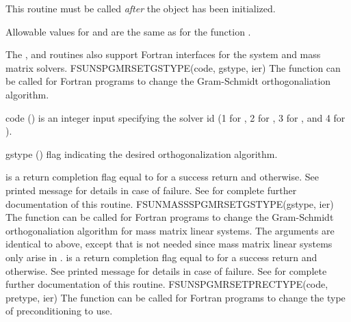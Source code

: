 {
  This routine must be called \emph{after} the {\nvector} object has
  been initialized.

  Allowable values for  and  are the same as for
  the {\CC} function \newline {}.
}
%
%
The , 
and \newline {} routines also
support Fortran interfaces for the system and mass matrix solvers.
%
%
{
  FSUNSPGMRSETGSTYPE(code, gstype, ier)
}
{
  The function  can be called for Fortran
  programs to change the Gram-Schmidt orthogonaliation algorithm.
}
{
  \begin{args}[gstype]
  \item[code] ()
    is an integer input specifying the solver id (1 for {\cvode}, 2
    for {\ida}, 3 for {\kinsol}, and 4 for {\arkode}).
  \item[gstype] ()
    flag indicating the desired orthogonalization algorithm.
  \end{args}
}
{
   is a  return completion flag equal to  for a success
  return and  otherwise. See printed message for details in case
  of failure.
}
{
  See  for complete further documentation of
  this routine.
}
%
%
{
  FSUNMASSSPGMRSETGSTYPE(gstype, ier)
}
{
  The function  can be called for Fortran
  programs to change the Gram-Schmidt orthogonaliation algorithm for
  mass matrix linear systems.
}
{
  The arguments are identical to  above, except that
   is not needed since mass matrix linear systems only arise
  in {\arkode}.
}
{
   is a  return completion flag equal to  for a success
  return and  otherwise. See printed message for details in case
  of failure.
}
{
  See  for complete further documentation of
  this routine.
}
%
%
{
  FSUNSPGMRSETPRECTYPE(code, pretype, ier)
}
{
  The function  can be called for Fortran
  programs to change the type of preconditioning to use.
}
